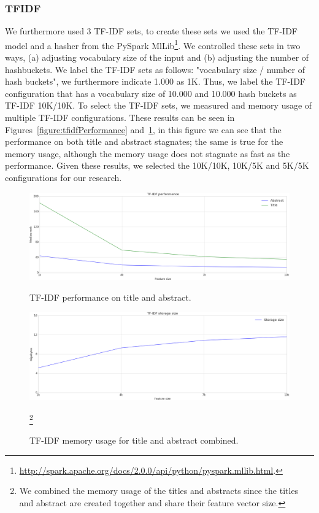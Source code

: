 \documentclass[runningheads]{llncs}
\begin{document}
\subsubsection{TFIDF}
We furthermore used 3 TF-IDF sets, to create these sets we used the TF-IDF model and a hasher from the PySpark MlLib\footnote{\url{http://spark.apache.org/docs/2.0.0/api/python/pyspark.mllib.html}.}. We controlled these sets in two ways, (a) adjusting vocabulary size of the input and (b) adjusting the number of hashbuckets. We label the TF-IDF sets as follows: "vocabulary size / number of hash buckets", we furthermore indicate 1.000 as 1K. Thus, we label the TF-IDF configuration that has a vocabulary size of 10.000 and 10.000 hash buckets as TF-IDF 10K/10K. To select the TF-IDF sets, we measured and memory usage of multiple TF-IDF configurations. These results can be seen in Figures~\ref{figure:tfidfPerformance} and~\ref{figure:tfidfMemory}, in this figure we can see that the performance on both title and abstract stagnates; the same is true for the memory usage, although the memory usage does not stagnate as fast as the performance. Given these results, we selected the 10K/10K, 10K/5K and 5K/5K configurations for our research.
\begin{figure}[hbt]
\includegraphics[width=5in]{Plots/tfidf_selection_plot_performance}
\caption{TF-IDF performance on title and abstract.}\label{figure:tfidfPerformance}
\includegraphics[width=5in]{Plots/tfidf_selection_plot_memory}
\caption{TF-IDF memory usage for title and abstract combined.}\footnote{We combined the memory usage of the titles and abstracts since the titles and abstract are created together and share their feature vector size.}\label{figure:tfidfMemory}
\end{figure}
\FloatBarrier
\end{document}
